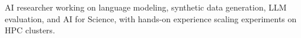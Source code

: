 %
%
%

\par{AI researcher working on language modeling, synthetic data generation, LLM evaluation, and AI for Science, with hands-on experience scaling experiments on HPC clusters.}
